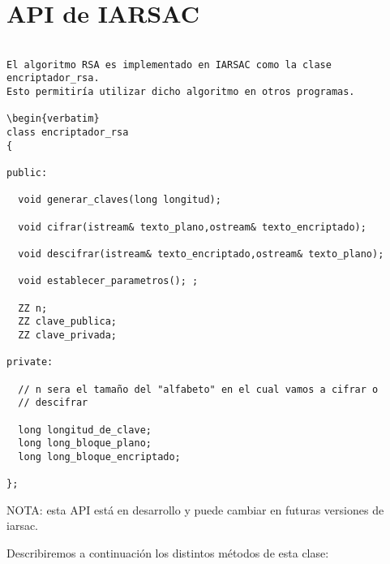 \documentclass[spanish]{article}
\begin{document}
\section{API de IARSAC}

\begin{verbatim}

El algoritmo RSA es implementado en IARSAC como la clase encriptador_rsa. 
Esto permitiría utilizar dicho algoritmo en otros programas.

\begin{verbatim}
class encriptador_rsa
{

public:
  
  void generar_claves(long longitud);
  
  void cifrar(istream& texto_plano,ostream& texto_encriptado);

  void descifrar(istream& texto_encriptado,ostream& texto_plano);
  
  void establecer_parametros(); ; 
 
  ZZ n;
  ZZ clave_publica;
  ZZ clave_privada;
 
private: 

  // n sera el tamaño del "alfabeto" en el cual vamos a cifrar o
  // descifrar

  long longitud_de_clave;
  long long_bloque_plano;
  long long_bloque_encriptado;
 
};

\end{verbatim}

NOTA: esta API está en desarrollo y puede cambiar en futuras versiones de
iarsac.

Describiremos a continuación los distintos métodos de esta clase:
\end{document}
